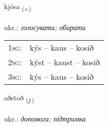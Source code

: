 \documentclass[frontgrid, backgrid]{flacards}\usepackage[]{graphicx}\usepackage[]{xcolor}
\begin{document}
\renewcommand{\flhead}{\vskip5pt \fboxsep=0pt {\small\bfseries\footnotesize Sagnorð | дієслово}}
\renewcommand{\fcfoot}{\vskip5pt \fboxsep=0pt \hspace{2pt}{\small\bfseries\footnotesize 1K}}

\renewcommand{\blhead}{\vskip5pt {\small\bfseries\footnotesize Sagnorð | дієслово }}
\renewcommand{\bcfoot}{\vskip5pt \hspace{2pt}{\small\bfseries\footnotesize 1K}}


{kjósa \small{\textsubscript{(\textit{v.})}} \\[1ex] %
\textphonetic{[cʰouːsa]} \\
ukr.: \emph{голосувати; обирати} \\  [2ex]
\renewcommand*{\arraystretch}{0.8}
\begin{tabular}{p{1cm}l}
\textsc{1sg}: & kýs -- kaus -- kosið \\ 
\textsc{2sg}: & kýst -- kaust -- kosið \\ 
\textsc{3sg}: & kýs -- kaus -- kosið \\ 
\end{tabular}
}

\renewcommand{\flhead}{\vskip5pt \fboxsep=0pt {\small\bfseries\footnotesize Nafnorð | іменник}}
\renewcommand{\fcfoot}{\vskip5pt \fboxsep=0pt \hspace{2pt}{\small\bfseries\footnotesize 1K}}

\renewcommand{\blhead}{\vskip5pt {\small\bfseries\footnotesize Nafnorð | іменник }}
\renewcommand{\bcfoot}{\vskip5pt \hspace{2pt}{\small\bfseries\footnotesize 1K}}


{aðstoð \small{\textsubscript{(\textit{f.})}} \\[1ex] %
\textphonetic{[aðstɔð]} \\
ukr.: \emph{допомога; підтримка} \\  [2ex]
\renewcommand*{\arraystretch}{0.8}
}
\end{document}
